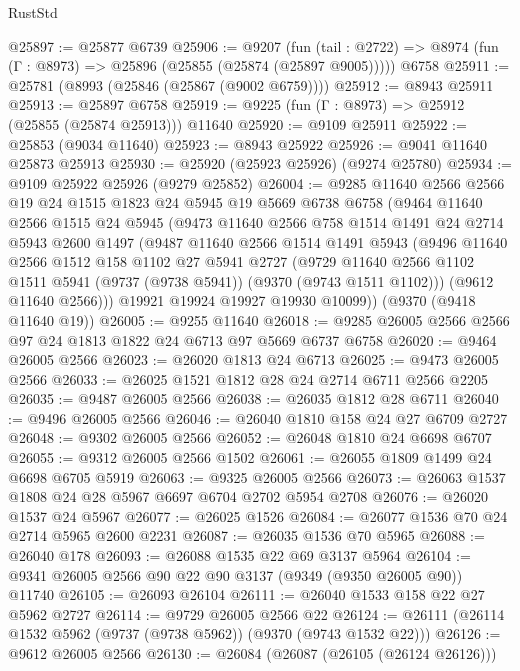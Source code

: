 \begin{lexlean}{RustStd}
\begin{coremodule}
@25897 := @25877 @6739
@25906 := @9207
    (fun (tail : @2722) => @8974 (fun (Γ : @8973) => @25896 (@25855 (@25874 (@25897 @9005)))))
    @6758
@25911 := @25781 (@8993 (@25846 (@25867 (@9002 @6759))))
@25912 := @8943 @25911
@25913 := @25897 @6758
@25919 := @9225 (fun (Γ : @8973) => @25912 (@25855 (@25874 @25913))) @11640
@25920 := @9109 @25911
@25922 := @25853 (@9034 @11640)
@25923 := @8943 @25922
@25926 := @9041 @11640 @25873 @25913
@25930 := @25920 (@25923 @25926) (@9274 @25780)
@25934 := @9109 @25922 @25926 (@9279 @25852)
@26004 := @9285
    @11640
    @2566
    @2566
    @19
    @24
    @1515
    @1823
    @24
    @5945
    @19
    @5669
    @6738
    @6758
    (@9464
      @11640
      @2566
      @1515
      @24
      @5945
      (@9473
        @11640
        @2566
        @758
        @1514
        @1491
        @24
        @2714
        @5943
        @2600
        @1497
        (@9487
          @11640
          @2566
          @1514
          @1491
          @5943
          (@9496
            @11640
            @2566
            @1512
            @158
            @1102
            @27
            @5941
            @2727
            (@9729 @11640 @2566 @1102 @1511 @5941 (@9737 (@9738 @5941)) (@9370 (@9743 @1511 @1102)))
            (@9612 @11640 @2566)))
        @19921
        @19924
        @19927
        @19930
        @10099))
    (@9370 (@9418 @11640 @19))
@26005 := @9255 @11640
@26018 := @9285 @26005 @2566 @2566 @97 @24 @1813 @1822 @24 @6713 @97 @5669 @6737 @6758
@26020 := @9464 @26005 @2566
@26023 := @26020 @1813 @24 @6713
@26025 := @9473 @26005 @2566
@26033 := @26025 @1521 @1812 @28 @24 @2714 @6711 @2566 @2205
@26035 := @9487 @26005 @2566
@26038 := @26035 @1812 @28 @6711
@26040 := @9496 @26005 @2566
@26046 := @26040 @1810 @158 @24 @27 @6709 @2727
@26048 := @9302 @26005 @2566
@26052 := @26048 @1810 @24 @6698 @6707
@26055 := @9312 @26005 @2566 @1502
@26061 := @26055 @1809 @1499 @24 @6698 @6705 @5919
@26063 := @9325 @26005 @2566
@26073 := @26063 @1537 @1808 @24 @28 @5967 @6697 @6704 @2702 @5954 @2708
@26076 := @26020 @1537 @24 @5967
@26077 := @26025 @1526
@26084 := @26077 @1536 @70 @24 @2714 @5965 @2600 @2231
@26087 := @26035 @1536 @70 @5965
@26088 := @26040 @178
@26093 := @26088 @1535 @22 @69 @3137 @5964
@26104 := @9341 @26005 @2566 @90 @22 @90 @3137 (@9349 (@9350 @26005 @90)) @11740
@26105 := @26093 @26104
@26111 := @26040 @1533 @158 @22 @27 @5962 @2727
@26114 := @9729 @26005 @2566 @22
@26124 := @26111 (@26114 @1532 @5962 (@9737 (@9738 @5962)) (@9370 (@9743 @1532 @22)))
@26126 := @9612 @26005 @2566
@26130 := @26084 (@26087 (@26105 (@26124 @26126)))

\end{coremodule}
\end{lexlean}
